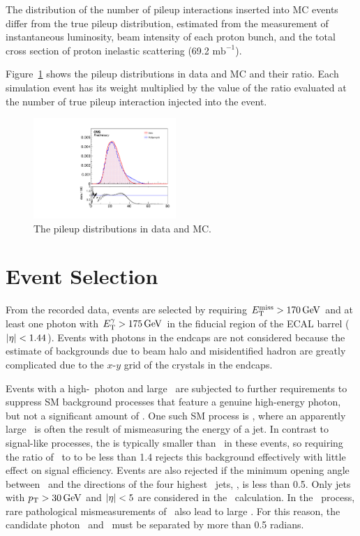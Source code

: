 The distribution of the number of pileup interactions inserted into MC events differ from the true pileup distribution, estimated from the measurement of instantaneous luminosity, beam intensity of each proton bunch, and the total cross section of proton inelastic scattering (69.2 $\textrm{mb}^{-1}$).

Figure~\ref{fig:pudist} shows the pileup distributions in data and MC and their ratio. 
Each simulation event has its weight multiplied by the value of the ratio evaluated at the number of true pileup interaction injected into the event.

\begin{figure}[htbp]
  \centering
  \includegraphics[width=0.48\textwidth]{Calibration/Figures/PUMoriond17.pdf}
  \caption{
    The pileup distributions in data and MC.
  }
  \label{fig:pudist}
\end{figure}

\section{Event Selection}
\label{sec:event_selection}

From the recorded data, events are selected by requiring $E_{\mathrm{T}}^{\text{miss}} > 170\,\text{Ge\hspace{-.08em}V}$ and at least one photon with $E_{\mathrm{T}}^{\gamma} > 175\,\text{Ge\hspace{-.08em}V}$ in the fiducial region of the ECAL barrel ($\lvert \eta \rvert < 1.44$). Events with photons in the endcaps are not considered because the estimate of backgrounds due to beam halo and misidentified hadron are greatly complicated due to the $x$-$y$ grid of the crystals in the endcaps.

Events with a high-\pt\ photon and large \met\ are subjected to further requirements to suppress SM background processes that feature a genuine high-energy photon, but not a significant amount of \met.
One such SM process is \gj, where an apparently large \met\ is often the result of mismeasuring the energy of a jet.
In contrast to signal-like processes, the \met is typically smaller than \ETg\ in these events, so requiring the ratio of \ETg\ to \met to be less than 1.4 rejects this background effectively with little effect on signal efficiency. %
Events are also rejected if the minimum opening angle between \ptvecmiss\ and the directions of the four highest \pt\ jets, \mindphijmet, is less than 0.5. %
Only jets with $p_{\mathrm{T}} > 30\,\text{Ge\hspace{-.08em}V}$ and $\lvert \eta \rvert < 5$ are considered in the \mindphijmet\ calculation.
In the \gj\ process, rare pathological mismeasurements of \ETg\ also lead to large \met. 
For this reason, the candidate photon \ptvec\ and \ptvecmiss\ must be separated by more than 0.5 radians. %

